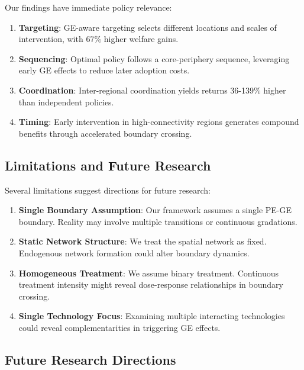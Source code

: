 Our findings have immediate policy relevance:

\begin{enumerate}
\item \textbf{Targeting}: GE-aware targeting selects different locations and scales of intervention, with 67\% higher welfare gains.

\item \textbf{Sequencing}: Optimal policy follows a core-periphery sequence, leveraging early GE effects to reduce later adoption costs.

\item \textbf{Coordination}: Inter-regional coordination yields returns 36-139\% higher than independent policies.

\item \textbf{Timing}: Early intervention in high-connectivity regions generates compound benefits through accelerated boundary crossing.
\end{enumerate}

\subsection{Limitations and Future Research}

Several limitations suggest directions for future research:

\begin{enumerate}
\item \textbf{Single Boundary Assumption}: Our framework assumes a single PE-GE boundary. Reality may involve multiple transitions or continuous gradations.

\item \textbf{Static Network Structure}: We treat the spatial network as fixed. Endogenous network formation could alter boundary dynamics.

\item \textbf{Homogeneous Treatment}: We assume binary treatment. Continuous treatment intensity might reveal dose-response relationships in boundary crossing.

\item \textbf{Single Technology Focus}: Examining multiple interacting technologies could reveal complementarities in triggering GE effects.
\end{enumerate}

\subsection{Future Research Directions}

